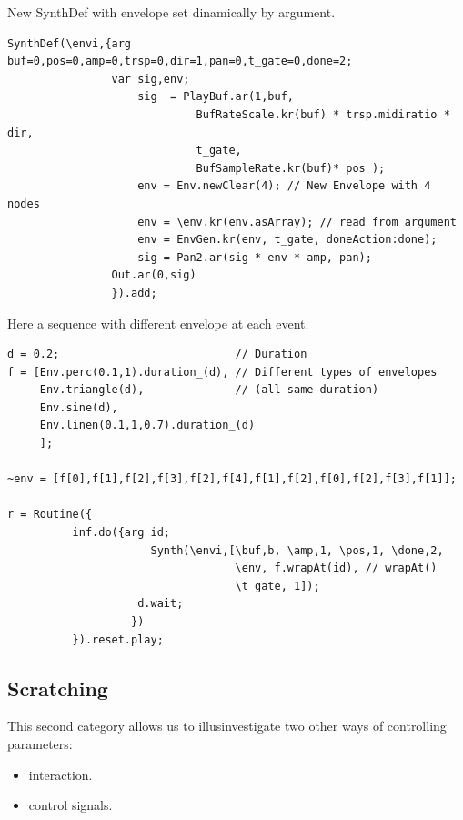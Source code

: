 \begin{itemize}
New SynthDef with envelope set dinamically by argument.

\begin{lstlisting}[frame=single,caption=Dynamic envelope model] 
SynthDef(\envi,{arg buf=0,pos=0,amp=0,trsp=0,dir=1,pan=0,t_gate=0,done=2;
                var sig,env;
                    sig  = PlayBuf.ar(1,buf,
                             BufRateScale.kr(buf) * trsp.midiratio * dir,
                             t_gate,
                             BufSampleRate.kr(buf)* pos );
                    env = Env.newClear(4); // New Envelope with 4 nodes
                    env = \env.kr(env.asArray); // read from argument
                    env = EnvGen.kr(env, t_gate, doneAction:done);
                    sig = Pan2.ar(sig * env * amp, pan);
                Out.ar(0,sig)
                }).add;
\end{lstlisting}

Here a sequence with different envelope at each event.

\begin{lstlisting}[frame=single] 
d = 0.2;                           // Duration
f = [Env.perc(0.1,1).duration_(d), // Different types of envelopes 
     Env.triangle(d),              // (all same duration)
     Env.sine(d),
     Env.linen(0.1,1,0.7).duration_(d)
     ];

~env = [f[0],f[1],f[2],f[3],f[2],f[4],f[1],f[2],f[0],f[2],f[3],f[1]];   

r = Routine({
          inf.do({arg id;                               
                      Synth(\envi,[\buf,b, \amp,1, \pos,1, \done,2,
                                   \env, f.wrapAt(id), // wrapAt()
                                   \t_gate, 1]); 
		            d.wait;                  
	               })
          }).reset.play;
\end{lstlisting}

\end{itemize}

\subsection{Scratching}\label{scratching}

This second category allows us to illusinvestigate two other ways of controlling parameters:

\begin{itemize}
\tightlist
\item interaction.
\item control signals.
\end{itemize}

